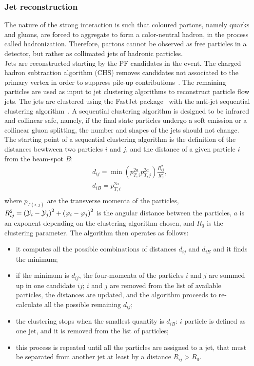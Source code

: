 \subsubsection{Jet reconstruction}
The nature of the strong interaction is such that coloured partons, namely quarks and gluons, are forced to aggregate to form a color-neutral hadron, in the process called hadronization. Therefore, partons cannot be observed as free particles in a detector, but rather as collimated jets of hadronic particles.\\
Jets are reconstructed starting by the PF candidates in the event. The charged hadron subtraction algorithm (CHS) removes candidates not associated to the primary vertex in order to suppress pile-up contributions~\cite{CMS-PAS-JME-14-001}. The remaining particles are used as input to jet clustering algorithms
to reconstruct particle flow jets. The jets are clustered using the {\sc FastJet} package~\cite{Cacciari:2011ma} with the anti-\kt jet sequential clustering algorithm~\cite{Cacciari:2008gp}. A sequential clustering algorithm is designed to be infrared and collinear safe, namely, if the final state particles undergo a soft emission or a collinear gluon splitting, the number and shapes of the jets should not change. The starting point of a sequential clustering algorithm is the definition of the distances bewtween two particles $i$ and $j$, and the distance of a given particle $i$ from the beam-spot $B$:
\begin{equation}
\begin{split}
& d_{ij} = \min \left( p_{T,i}^{2a} p_{T,j}^{2a} \right) \frac{R_{ij}^2}{R_0^2},\\
& d_{iB} = p_{T,i}^{2a}\\
\end{split}
\label{eq:dist_akt}
\end{equation}
where $p_{T(i,j)}$ are the transverse momenta of the particles, $R_{ij}^2 = \left( \mathcal{Y}_i - \mathcal{Y}_j \right)^2 + \left( \varphi_i - \varphi_j\right)^2$ is the angular distance between the particles, $a$ is an exponent depending on the clustering algorithm chosen, and $R_0$ is the clustering parameter. The algorithm then operates as follows:
\begin{itemize}
\item it computes all the possible combinations of distances $d_{ij}$ and $d_{iB}$ and it finds the minimum;
\item if the minimum is $d_{ij}$, the four-momenta of the particles $i$ and $j$ are summed up in one candidate $ij$; $i$ and $j$ are removed from the list of available particles, the distances are updated, and the algorithm proceeds to re-calculate all the possible remaining $d_{ij}$;
\item the clustering stops when the smallest quantity is $d_{iB}$: $i$ particle is defined as one jet, and it is removed from the list of particles;
\item this process is repeated until all the particles are assigned to a jet, that must be separated from another jet at least by a distance $R_{ij} > R_0$.
\end{itemize}

